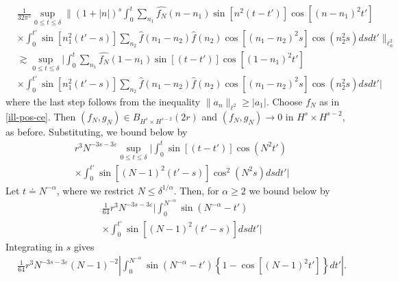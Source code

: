 \documentclass[12pt,reqno]{amsart}
\numberwithin{equation}{section}  %
\newcommand{\wh}{\widehat}
\newcommand{\ee}{\varepsilon}
\begin{document}
\begin{equation*}
\begin{split}
  & \frac{1}{32 \pi^{5}} \sup_{0 \le t \le \delta} \| (1 + | n |)^{s}  
  \int_{0}^{t} \sum_{n_{1}} \wh{f_{N}}(n - n_{1}) \sin[n^{2}(t - t')]
  \cos[(n - n_{1})^{2}t']
  \\
  & \times \int_{0}^{t'} \sin[n_{1}^{2}(t' -s)]
  \sum_{n_{2}} 
  \wh{f}(n_{1} - n_{2}) \wh{f}(n_{2}) \cos[(n_{1} - n_{2})^{2}s ]
  \cos(n_{2}^{2}s) ds dt'
  \|_{\ell^{2}_{n}}
  \\
  & \gtrsim \sup_{0 \le t \le \delta} 
  | \int_{0}^{t} \sum_{n_{1}} \wh{f_{N}}(1 - n_{1}) \sin[(t - t')]
  \cos[(1 - n_{1})^{2}t']
  \\
  & \times \int_{0}^{t'} \sin[n_{1}^{2}(t' -s)]
  \sum_{n_{2}} 
  \wh{f}(n_{1} - n_{2}) \wh{f}(n_{2}) \cos[(n_{1} - n_{2})^{2}s ]
  \cos(n_{2}^{2}s) ds dt' |
\end{split}
\end{equation*}
%
where the last step follows from the inequality $\| a_{n} \|_{\ell^{2}} \ge
|a_{1}|$. Choose $f_N$ as in \eqref{ill-pos-ce}. Then
$(f_{N}, g_{N}) \in B_{H^{s} \times H^{s-2}}(2r)$ and $(f_{N}, g_{N}) \to 0$ in
$H^{s} \times H^{s-2}$, as before. Substituting, we bound below by
%
%
%
\begin{equation*}
\begin{split}
  & r^{3} N^{-3s - 3 \ee} \sup_{0 \le t \le \delta} 
  | \int_{0}^{t} \sin[(t - t')] \cos(N^{2}t')
  \\
  & \times \int_{0}^{t'} \sin[(N-1)^{2}(t' -s)]
  \cos^{2}(N^{2}s )
  ds dt' |
\end{split}
\end{equation*}
%
Let $t \doteq N^{-\alpha}$, where we restrict $N \le
\delta^{1/\alpha}$. Then, for $\alpha \ge 2$ we bound below by
%
%
\begin{equation*}
\begin{split}
  & \frac{1}{64} r^{3} N^{-3s - 3 \ee} 
  | \int_{0}^{N^{-\alpha}} \sin(N^{-\alpha} - t') 
  \\
  & \times \int_{0}^{t'} \sin[(N-1)^{2}(t' -s)]
  ds dt' |
\end{split}
\end{equation*}
%
%
%
%
%
Integrating in $s$ gives
%
%
\begin{equation}
  \label{gfd}
\begin{split}
  & \frac{1}{64} r^{3} N^{-3s - 3 \ee}(N-1)^{-2} 
| \int_{0}^{N^{-\alpha}} \sin(N^{-\alpha} - t')
\left\{1 -\cos[ (N-1)^{2}t']  \right \} dt' |.
\end{split}
\end{equation}
\end{document}
